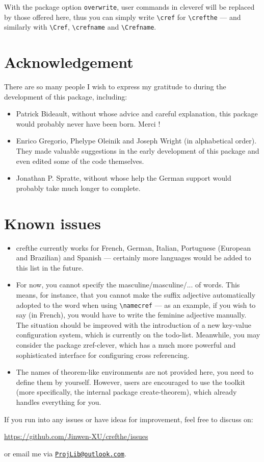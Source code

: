 \documentclass[classical]{einfart}
\newcommand{\packageoption}[1]{\texttt{\textcolor{code-option}{#1}}}
\newcommand{\crefthepackage}{\textsf{crefthe}}
\begin{document}
With the package option \packageoption{overwrite}, user commands in \textsf{cleveref} will be replaced by those offered here, thus you can simply write \lstinline|\cref| for \lstinline|\crefthe| --- and similarly with \lstinline|\Cref|, \lstinline|\crefname| and \lstinline|\Crefname|.


\clearpage


\section{Acknowledgement}

There are so many people I wish to express my gratitude to during the development of this package, including:

\begin{itemize}
    \item Patrick Bideault, without whose advice and careful explanation, this package would probably never have been born. Merci !
    \item Enrico Gregorio, Phelype Oleinik and Joseph Wright (in alphabetical order). They made valuable suggestions in the early development of this package and even edited some of the code themselves.
    \item Jonathan P. Spratte, without whose help the German support would probably take much longer to complete.
\end{itemize}



\section{Known issues}
\begin{itemize}
    \item \crefthepackage{} currently works for French, German, Italian, Portuguese (European and Brazilian) and Spanish --- certainly more languages would be added to this list in the future.
    \item For now, you cannot specify the masculine/masculine/... of words. This means, for instance, that you cannot make the suffix adjective automatically adopted to the word when using \lstinline|\namecref| --- as an example, if you wish to say  (in French), you would have to write the feminine adjective manually. The situation should be improved with the introduction of a new key-value configuration system, which is currently on the todo-list.
    Meanwhile, you may consider the package \textsf{zref-clever}, which has a much more powerful and sophisticated interface for configuring cross referencing.
    \item The names of theorem-like environments are not provided here, you need to define them by yourself. However, users are encouraged to use the \ProjLib{} toolkit (more specifically, the internal package \textsf{create-theorem}), which already handles everything for you.
\end{itemize}

\medskip
If you run into any issues or have ideas for improvement, feel free to discuss on:
\begin{center}
    \url{https://github.com/Jinwen-XU/crefthe/issues}
\end{center}
or email me via \href{mailto:ProjLib@outlook.com}{\texttt{ProjLib@outlook.com}}.
\end{document}
